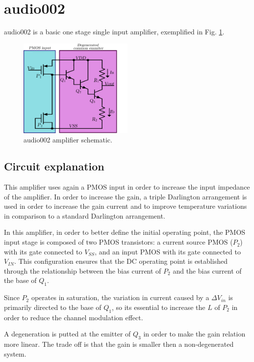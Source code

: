 \documentclass[12pt]{article}
\begin{document}
\section{audio002}

audio002 is a basic one stage single input amplifier, exemplified in Fig. \ref{audio002}.
\begin{figure}[H]
        \centering
        \includegraphics[width=0.5\textwidth]{audio002.pdf}
        \caption{audio002 amplifier schematic.}
        \label{audio002}
\end{figure}

\subsection{Circuit explanation}
This amplifier uses again a PMOS input in order to increase the input impedance of the amplifier. In order to increase the gain, a triple Darlington arrangement is used in order to increase the gain current and to improve temperature variations in comparison to a standard Darlington arrangement.

In this amplifier, in order to better define the initial operating point, the PMOS input stage is composed of two PMOS transistors: a current source PMOS ($P_2$) with its gate connected to $V_{SS}$, and an input PMOS with its gate connected to $V_{IN}$. This configuration ensures that the DC operating point is established through the relationship between the bias current of $P_2$ and the bias current of the base of $Q_1$.  

Since $P_2$ operates in saturation, the variation in current caused by a $\Delta V_{in}$ is primarily directed to the base of $Q_1$, so its essential to increase the $L$ of $P_{2}$ in order to reduce the channel modulation effect.

 A degeneration is putted  at the emitter of $Q_3$ in order to make the gain relation more linear. The trade off is that the gain is smaller then a non-degenerated system.
\end{document}
